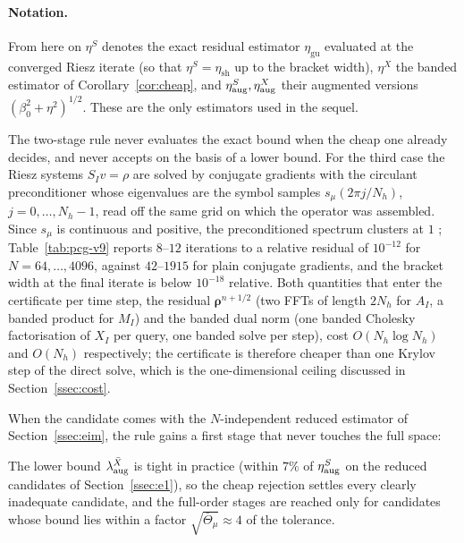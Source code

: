 \documentclass[11pt]{amsart}
\theoremstyle{remark}
\newcommand{\etaSharp}{\eta_{\mathrm{sh}}}
\newcommand{\etaGuar}{\eta_{\mathrm{gu}}}
\newcommand{\rr}{\bm\rho}
\newcommand{\sym}[1]{#1}                 %
\begin{document}
\paragraph{Notation.}
From here on $\eta^S$ denotes the exact residual estimator $\etaGuar$ evaluated at the converged
Riesz iterate (so that $\eta^S=\etaSharp$ up to the bracket width), $\eta^X$ the banded estimator
of Corollary~\ref{cor:cheap}, and $\eta^S_{\rm aug},\eta^X_{\rm aug}$ their augmented versions
$(\beta_0^2+\eta^2)^{1/2}$.  These are the only estimators used in the sequel.

The two-stage rule never evaluates the exact bound when the cheap one already decides, and never
accepts on the basis of a lower bound.  For the third case the Riesz systems $S_Iv=\rho$ are
solved by conjugate gradients with the circulant preconditioner whose eigenvalues are the symbol
samples $\sym{s}_\mu(2\pi j/N_h)$, $j=0,\dots,N_h-1$, read off the same grid on which the operator
was assembled.  Since $\sym{s}_\mu$ is continuous and positive, the preconditioned spectrum
clusters at $1$ \cite{ChanStrang1989}; Table~\ref{tab:pcg-v9} reports $8$--$12$ iterations to a
relative residual of $10^{-12}$ for $N=64,\dots,4096$, against $42$--$1915$ for plain conjugate
gradients, and the bracket width at the final iterate is below $10^{-18}$ relative.  Both
quantities that enter the certificate per time step, the residual $\rr^{n+1/2}$ (two FFTs of
length $2N_h$ for $A_I$, a banded product for $M_I$) and the banded dual norm (one banded
Cholesky factorisation of $X_I$ per query, one banded solve per step), cost $O(N_h\log N_h)$ and
$O(N_h)$ respectively; the certificate is therefore cheaper than one Krylov step of the direct
solve, which is the one-dimensional ceiling discussed in Section~\ref{ssec:cost}.

When the candidate comes with the $N$-independent reduced estimator of Section~\ref{ssec:eim}, the
rule gains a first stage that never touches the full space:

The lower bound $\lambda^{\bar X}_{\rm aug}$ is tight in practice (within $7\%$ of $\eta^S_{\rm aug}$ on the
reduced candidates of Section~\ref{ssec:e1}), so the cheap rejection settles every clearly
inadequate candidate, and the full-order stages are reached only for candidates whose bound lies
within a factor $\sqrt{\bar\Theta_\mu}\approx4$ of the tolerance.
\end{document}
